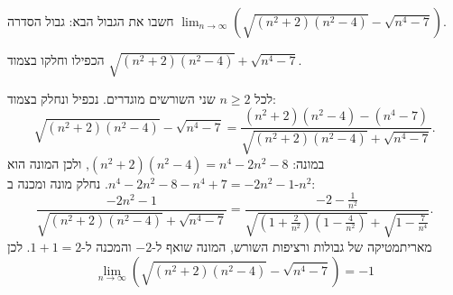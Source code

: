 
\begin{question}
חשבו את הגבול הבא:
גבול הסדרה $\displaystyle\lim_{n\to\infty}\left(\sqrt{(n^2+2)(n^2-4)}-\sqrt{n^4-7}\right)$.
\end{question}

\begin{hint}
הכפילו וחלקו בצמוד $\sqrt{(n^2+2)(n^2-4)}+\sqrt{n^4-7}$.
\end{hint}

\begin{solution}
לכל $n\ge2$ שני השורשים מוגדרים. נכפיל ונחלק בצמוד:
\[ \sqrt{(n^2+2)(n^2-4)}-\sqrt{n^4-7}=\frac{(n^2+2)(n^2-4)-(n^4-7)}{\sqrt{(n^2+2)(n^2-4)}+\sqrt{n^4-7}}. \]
במונה: $(n^2+2)(n^2-4)=n^4-2n^2-8$, ולכן המונה הוא $n^4-2n^2-8-n^4+7=-2n^2-1$. נחלק מונה ומכנה ב-$n^2$:
\[ \frac{-2n^2-1}{\sqrt{(n^2+2)(n^2-4)}+\sqrt{n^4-7}}=\frac{-2-\frac1{n^2}}{\sqrt{\left(1+\frac2{n^2}\right)\left(1-\frac4{n^2}\right)}+\sqrt{1-\frac7{n^4}}}. \]
מאריתמטיקה של גבולות ורציפות השורש, המונה שואף ל-$-2$ והמכנה ל-$1+1=2$. לכן
\[ \boxed{\lim_{n\to\infty}\left(\sqrt{(n^2+2)(n^2-4)}-\sqrt{n^4-7}\right)=-1} \]
\end{solution}
